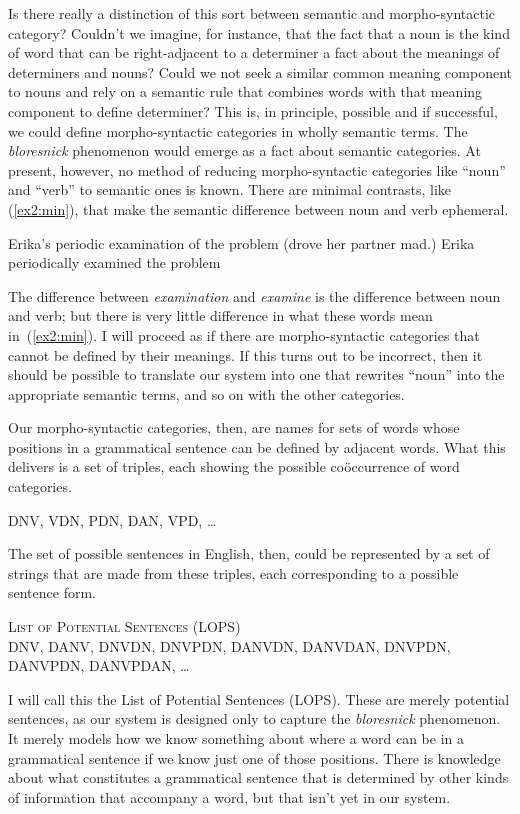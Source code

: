 Is there really a distinction of this sort between semantic and morpho-syntactic category? Couldn't we imagine, for instance, that the fact that a noun is the kind of word that can be right-adjacent to a determiner a fact about the meanings of determiners and nouns? Could we not seek a similar common meaning component to nouns and rely on a semantic rule that combines words with that meaning component to define determiner? This is, in principle, possible and if successful, we could define morpho-syntactic categories in wholly semantic terms. The \emph{bloresnick} phenomenon would emerge as a fact about semantic categories. At present, however, no method of reducing morpho-syntactic categories like ``noun'' and ``verb'' to semantic ones is known. There are minimal contrasts, like (\ref{ex2:min}), that make the semantic difference between noun and verb ephemeral.
\begin{exe}
	\raggedright
	\ex \label{ex2:min} 
	\begin{xlist}
		\ex Erika's periodic examination of the problem (drove her partner mad.)
		\ex Erika periodically examined the problem
	\end{xlist}
\end{exe}
The difference between \emph{examination} and \emph{examine} is the difference between noun and verb; but there is very little difference in what these words mean in~(\ref{ex2:min}). I will proceed as if there are morpho-syntactic categories that cannot be defined by their meanings. If this turns out to be incorrect, then it should be possible to translate our system into one that rewrites ``noun'' into the appropriate semantic terms, and so on with the other categories.

Our morpho-syntactic categories, then, are names for sets of words whose positions in a grammatical sentence can be defined by adjacent words. What this delivers is a set of triples, each showing the possible co\"occurrence of word categories.
\begin{exe}
	\raggedright
	\ex \label{ex2:cooc} 
	DNV, VDN, PDN, DAN, VPD, \ldots
\end{exe}
The set of possible sentences in English, then, could be represented by a set of strings that are made from these triples, each corresponding to a possible sentence form.
\begin{exe}
	\raggedright
	\ex \label{ex2:sets} \textsc{List of Potential Sentences (LOPS)}\\[5pt]
	DNV, DANV, DNVDN, DNVPDN, DANVDN, DANVDAN, DNVPDN, DANVPDN, DANVPDAN, \ldots
\end{exe}
I will call this the List of Potential Sentences (LOPS). These are merely potential sentences, as our system is designed only to capture the \emph{bloresnick} phenomenon. It merely models how we know something about where a word can be in a grammatical sentence if we know just one of those positions. There is knowledge about what constitutes a grammatical sentence that is determined by other kinds of information that accompany a word, but that isn't yet in our system. 

